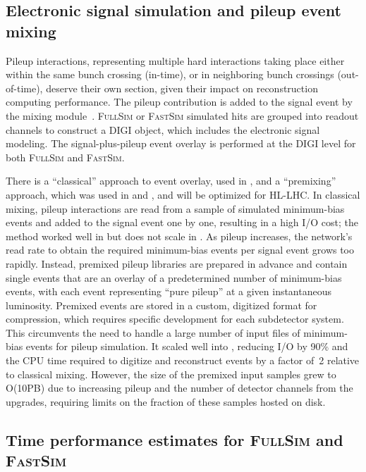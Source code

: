 \subsection{Electronic signal simulation and pileup event mixing}

Pileup interactions, representing multiple hard interactions taking place either within the same bunch crossing (in-time), or in neighboring bunch crossings (out-of-time), deserve their own section, given their impact on \PhaseTwo reconstruction computing performance. The pileup contribution is added to the signal event by the mixing module~\cite{Lange:2015sba}. \textsc{FullSim} or \textsc{FastSim} simulated hits are grouped into readout channels to construct a \gls{DIGI} object, which includes the electronic signal modeling. The signal-plus-pileup event overlay is performed at the \gls{DIGI} level for both \textsc{FullSim} and \textsc{FastSim}.

There is a ``classical'' approach to event overlay, used in \RunOne, and a ``premixing''~\cite{Hildreth:2017vpw} approach, which was used in \RunTwo and \RunThree, and will be optimized for \gls{HL-LHC}. In classical mixing, pileup interactions are read from a sample of simulated minimum-bias events and added to the signal event one by one, resulting in a high I/O cost; the method worked well in \RunOne but does not scale in \RunTwo. As pileup increases, the network’s read rate to obtain the required minimum-bias events per signal event grows too rapidly. Instead, premixed pileup libraries are prepared in advance and contain single events that are an overlay of a predetermined number of minimum-bias events, with each event representing ``pure pileup'' at a given instantaneous luminosity. 
Premixed events are stored in a custom, digitized format for compression, which requires specific development for each subdetector system.
This circumvents the need to handle a large number of input files of minimum-bias events for pileup simulation. It scaled well into \RunThree, reducing I/O by 90\% and the \gls{CPU} time required to digitize and reconstruct events by a factor of~2 relative to classical mixing. 
However, the size of the premixed input samples grew to O(10\unit{PB}) due to increasing pileup and the number of detector channels from the \PhaseOne upgrades, requiring limits on the fraction of these samples hosted on disk.

\subsection{Time performance estimates for \textsc{FullSim} and \textsc{FastSim}}

